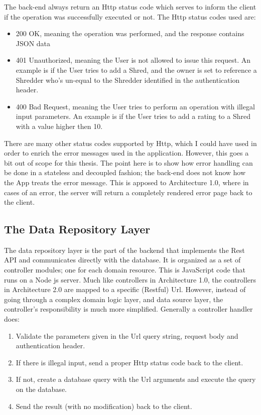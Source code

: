 The back-end always return an Http status code which serves to inform the client if the operation was successfully executed or not. The Http status codes used are:
\begin{itemize}
\item{}200 OK, meaning the operation was performed, and the response contains JSON data
\item{} 401 Unauthorized, meaning the User is not allowed to issue this request. An example is if the User tries to add a Shred, and the owner is set to reference a Shredder who's un-equal to the Shredder identified in the authentication header.
\item{} 400 Bad Request, meaning the User tries to perform an operation with illegal input parameters. An example is if the User tries to add a rating to a Shred with a value higher then 10.
\end{itemize}
There are many other status codes supported by Http, which I could have used in order to enrich the error messages used in the application. However, this goes a bit out of scope for this thesis. The point here is to show how error handling can be done in a stateless and decoupled fashion; the back-end does not know how the App treats the error message. This is apposed to Architecture 1.0, where in cases of an error, the server will return a completely rendered error page back to the client.

\subsection{The Data Repository Layer}
The data repository layer is the part of the backend that implements the Rest API and communicates directly with the database. It is organized as a set of controller modules; one for each domain resource. This is JavaScript code that runs on a Node js server. Much like controllers in Architecture 1.0, the controllers in Architecture 2.0 are mapped to a specific (Restful) Url. However, instead of going through a complex domain logic layer, and data source layer, the controller's responsibility is much more simplified. Generally a controller handler does:
\begin{enumerate}
\item{} Validate the parameters given in the Url query string, request body and authentication header.
\item{} If there is illegal input, send a proper Http status code back to the client.
\item{} If not, create a database query with the Url arguments and execute the query on the database.
\item{} Send the result (with no modification) back to the client. 
\end{enumerate}


